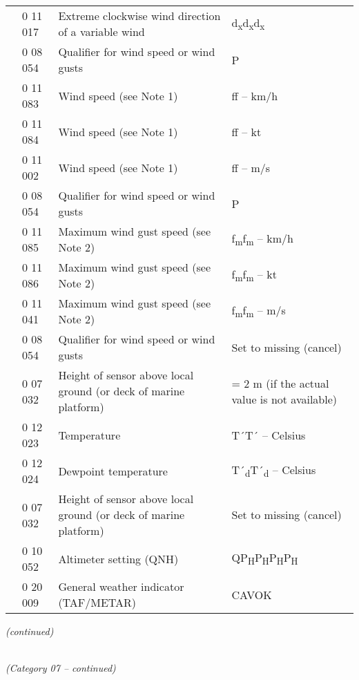 \begin{longtable}[]{@{}llll@{}}
& 0 11 017 & Extreme clockwise wind direction of a variable wind & d\textsubscript{x}d\textsubscript{x}d\textsubscript{x}\tabularnewline
& 0 08 054 & Qualifier for wind speed or wind gusts & P\tabularnewline
& 0 11 083 & Wind speed (see Note 1) & ff -- km/h\tabularnewline
& 0 11 084 & Wind speed (see Note 1) & ff -- kt\tabularnewline
& 0 11 002 & Wind speed (see Note 1) & ff -- m/s\tabularnewline
& 0 08 054 & Qualifier for wind speed or wind gusts & P\tabularnewline
& 0 11 085 & Maximum wind gust speed (see Note 2) & f\textsubscript{m}f\textsubscript{m} -- km/h\tabularnewline
& 0 11 086 & Maximum wind gust speed (see Note 2) & f\textsubscript{m}f\textsubscript{m} -- kt\tabularnewline
& 0 11 041 & Maximum wind gust speed (see Note 2) & f\textsubscript{m}f\textsubscript{m} -- m/s\tabularnewline
& 0 08 054 & Qualifier for wind speed or wind gusts & Set to missing (cancel)\tabularnewline
& 0 07 032 & Height of sensor above local ground (or deck of marine platform) & = 2 m (if the actual value is not available)\tabularnewline
& 0 12 023 & Temperature & T´T´ -- Celsius\tabularnewline
& 0 12 024 & Dewpoint temperature & T´\textsubscript{d}T´\textsubscript{d} -- Celsius\tabularnewline
& 0 07 032 & Height of sensor above local ground (or deck of marine platform) & Set to missing (cancel)\tabularnewline
& 0 10 052 & Altimeter setting (QNH) & QP\textsubscript{H}P\textsubscript{H}P\textsubscript{H}P\textsubscript{H}\tabularnewline
& 0 20 009 & General weather indicator (TAF/METAR) & CAVOK\tabularnewline
\bottomrule
\end{longtable}

\emph{(continued)}

\emph{\\
(Category 07 -- continued)}

